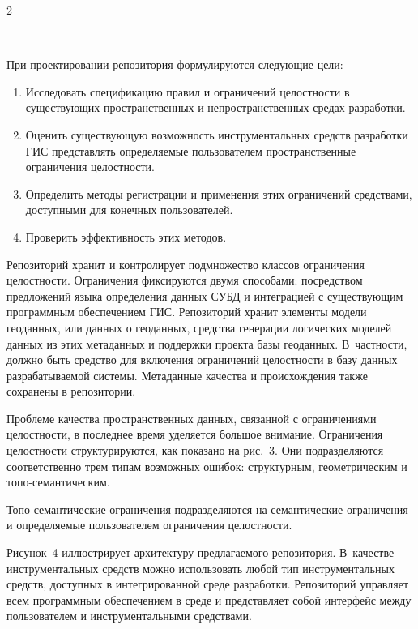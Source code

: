\begin{multicols}{2}
\begin{figure}[b] %
 \vspace*{1pt}
 \begin{center}
 \mbox{%
 \epsfxsize=101.181mm
 }
 \end{center}
 \vspace*{-9pt}
\end{figure}


      При проектировании репозитория формулируются следующие цели:
      \begin{enumerate}[1.]
\item Исследовать спецификацию правил и ограничений целостности в существующих 
пространственных и непространственных средах разработки.
\item Оценить существующую возможность инструментальных средств разработки ГИС 
пред\-став\-лять определяемые пользователем пространственные ограничения целостности.
\item Определить методы регистрации и применения этих ограничений средствами, 
доступными для конечных пользователей.
\item Проверить эффективность этих методов.
      \end{enumerate}
      
      Репозиторий хранит и контролирует подмножество классов ограничения 
целостности. Ограничения фиксируются двумя способами: посредством предложений 
языка определения данных СУБД и интеграцией с существующим программным 
обеспечением ГИС. Репозиторий хранит элементы модели геоданных, или данных о 
геоданных, средства генерации логических моделей данных из этих метаданных и 
поддержки проекта базы геоданных. В~частности, должно быть средство для включения 
ограничений целостности в базу данных разрабатываемой системы. Метаданные качества 
и происхождения также сохранены в репозитории. 
      
      Проблеме качества пространственных данных, связанной с ограничениями 
целостности, в последнее время уделяется большое внимание. Ограничения целостности 
структурируются, как показано на рис.~3. Они подразделяются соответственно трем типам 
возможных ошибок: структурным, гео\-мет\-рическим и 
      то\-по-се\-ман\-ти\-че\-ским. 
      
      То\-по-се\-ман\-ти\-че\-ские ограничения подразделяются 
на семантические ограничения и опреде\-ля\-емые пользователем ограничения целостности. 

      Рисунок~4 иллюстрирует архитектуру предлагаемого репозитория. В~качестве 
инструментальных средств можно использовать любой тип инструментальных средств, 
доступных в интегрированной среде разработки. Репозиторий управляет всем 
программным обеспечением в среде и представляет собой интерфейс между 
пользователем и инструментальными средствами. 


\end{multicols}
